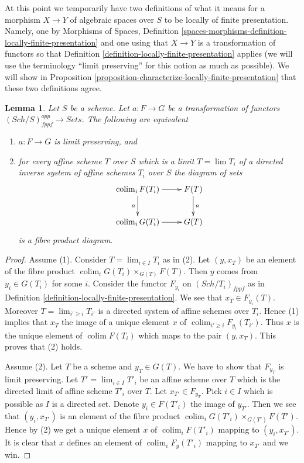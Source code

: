 \documentclass{stacks-project}
\theoremstyle{plain}
\newtheorem{lemma}[subsection]{Lemma}
\theoremstyle{definition}
\theoremstyle{remark}
\numberwithin{equation}{subsection}
\def\lim{\mathop{\mathrm{lim}}\nolimits}
\def\colim{\mathop{\mathrm{colim}}\nolimits}
\def\Sch{\mathit{Sch}}
\begin{document}
\medskip\noindent
At this point we temporarily have two definitions of what it means
for a morphism $X \to Y$ of algebraic spaces over $S$ to be locally of finite
presentation. Namely, one by
Morphisms of Spaces,
Definition \ref{spaces-morphisms-definition-locally-finite-presentation}
and one using that $X \to Y$ is a transformation of functors so that
Definition \ref{definition-locally-finite-presentation}
applies (we will use the terminology ``limit preserving''
for this notion as much as possible). We will show in
Proposition \ref{proposition-characterize-locally-finite-presentation}
that these two definitions agree.

\begin{lemma}
\label{lemma-characterize-relative-limit-preserving}
Let $S$ be a scheme. Let $a : F \to G$ be a transformation of functors
$(\Sch/S)_{fppf}^{opp} \to \textit{Sets}$.
The following are equivalent
\begin{enumerate}
\item $a : F \to G$ is limit preserving, and
\item for every affine scheme $T$ over $S$ which is a
limit $T = \lim T_i$ of a directed inverse system of affine
schemes $T_i$ over $S$ the diagram of sets
$$
\xymatrix{
\colim_i F(T_i) \ar[r] \ar[d]_a & F(T) \ar[d]^a \\
\colim_i G(T_i) \ar[r] & G(T)
}
$$
is a fibre product diagram.
\end{enumerate}
\end{lemma}

\begin{proof}
Assume (1). Consider $T = \lim_{i \in I} T_i$ as in (2). Let
$(y, x_T)$ be an element of the fibre product
$\colim_i G(T_i) \times_{G(T)} F(T)$.
Then $y$ comes from $y_i \in G(T_i)$ for some $i$.
Consider the functor $F_{y_i}$ on $(\Sch/T_i)_{fppf}$ as in
Definition \ref{definition-locally-finite-presentation}.
We see that $x_T \in F_{y_i}(T)$. Moreover $T = \lim_{i' \geq i} T_{i'}$
is a directed system of affine schemes over $T_i$. Hence (1) implies
that $x_T$ the image of a unique element $x$ of
$\colim_{i' \geq i} F_{y_i}(T_{i'})$. Thus $x$ is the unique
element of $\colim F(T_i)$ which maps to the pair $(y, x_T)$.
This proves that (2) holds.

\medskip\noindent
Assume (2). Let $T$ be a scheme and $y_T \in G(T)$. We have to show that
$F_{y_T}$ is limit preserving. Let $T' = \lim_{i \in I} T'_i$ be an
affine scheme over $T$ which is the directed limit of affine scheme $T'_i$
over $T$. Let $x_{T'} \in F_{y_T}$. Pick $i \in I$ which is possible as
$I$ is a directed set. Denote $y_i \in F(T'_i)$ the
image of $y_{T'}$. Then we see that $(y_i, x_{T'})$ is an
element of the fibre product
$\colim_i G(T'_i) \times_{G(T')} F(T')$.
Hence by (2) we get a unique element $x$ of $\colim_i F(T'_i)$
mapping to $(y_i, x_{T'})$. It is clear that $x$ defines an element
of $\colim_i F_y(T'_i)$ mapping to $x_{T'}$ and we win.
\end{proof}
\end{document}

